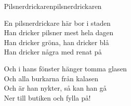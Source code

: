 \begin{song}{Pilsnerdrickaren}{pilsnerdrickaren}
\begin{vers}
En pilsnerdrickare här bor i staden\\
Han dricker pilsner mest hela dagen\\
Han dricker gröna, han dricker blå\\
Han dricker några med renat på\\
\end{vers}
\begin{vers}
Och i hans fönster hänger tomma glasen\\
Och alla burkarna från kalasen\\
Och är han nykter, så kan han gå\\
Ner till butiken och fylla på!\\
\end{vers}
\end{song}
